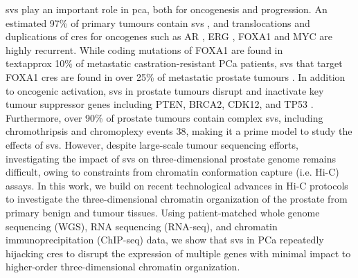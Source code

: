 \glspl{sv} play an important role in \gls{pca}, both for oncogenesis and progression.
An estimated 97\% of primary tumours contain \glspl{sv} \cite{liPatternsSomaticStructural2020,fraserGenomicHallmarksLocalized2017}, and translocations and duplications of \glspl{cre} for oncogenes such as AR \cite{takedaSomaticallyAcquiredEnhancer2018}, ERG \cite{rosenClinicalPotentialERG2012}, FOXA1 \cite{quigleyGenomicHallmarksStructural2018,paroliaDistinctStructuralClasses2019} and MYC \cite{paroliaDistinctStructuralClasses2019} are highly recurrent.
While coding mutations of FOXA1 are found in \\textapprox 10\% of metastatic castration-resistant PCa patients, \glspl{sv} that target FOXA1 \glspl{cre} are found in over 25\% of metastatic prostate tumours \cite{paroliaDistinctStructuralClasses2019}.
In addition to oncogenic activation, \glspl{sv} in prostate tumours disrupt and inactivate key tumour suppressor genes including PTEN, BRCA2, CDK12, and TP53 \cite{quigleyGenomicHallmarksStructural2018,abeshouseMolecularTaxonomyPrimary2015}.
Furthermore, over 90\% of prostate tumours contain complex \glspl{sv}, including chromothripsis and chromoplexy events 38, making it a prime model to study the effects of \glspl{sv}.
However, despite large-scale tumour sequencing efforts, investigating the impact of \glspl{sv} on three-dimensional prostate genome remains difficult, owing to constraints from chromatin conformation capture (i.e. Hi-C) assays.
In this work, we build on recent technological advances in Hi-C protocols to investigate the three-dimensional chromatin organization of the prostate from primary benign and tumour tissues.
Using patient-matched whole genome sequencing (WGS), RNA sequencing (RNA-seq), and chromatin immunoprecipitation (ChIP-seq) data, we show that \glspl{sv} in PCa repeatedly hijacking \glspl{cre} to disrupt the expression of multiple genes with minimal impact to higher-order three-dimensional chromatin organization.

